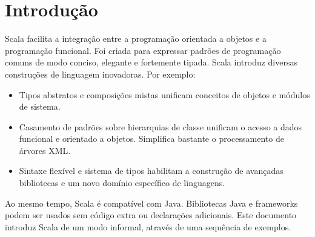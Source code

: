 \documentclass[a4paper,12pt,twoside,titlepage]{book}
\begin{document}
\frontmatter
\makedoctitle
\clearemptydoublepage
\tableofcontents
\mainmatter
\sloppy

\chapter{\label{chap:intro}Introdução}

Scala facilita a integração entre a  programação orientada a objetos e a programação funcional.
Foi criada para expressar padrões de programação comuns de modo conciso, elegante e fortemente tipada. 
Scala introduz diversas construções de linguagem inovadoras. Por exemplo:

\begin{itemize}
\item
Tipos abstratos e composições mistas unificam conceitos de objetos e módulos de sistema.

\item
Casamento de padrões sobre hierarquias de classe unificam o acesso a dados funcional e orientado a 
objetos. Simplifica bastante o processamento de árvores XML.

\item
Sintaxe flexível e sistema de tipos habilitam a construção de avançadas 
bibliotecas e um novo domínio específico de linguagens.
\end{itemize}


Ao mesmo tempo, Scala é compatível com Java. Bibliotecas Java e frameworks
podem ser usados sem código extra ou declarações adicionais.
Este documento introduz Scala de um modo informal, através de uma sequência
de exemplos.
\end{document}
